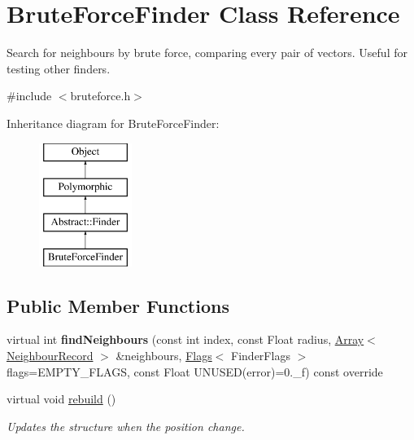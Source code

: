 \hypertarget{classBruteForceFinder}{}\section{Brute\+Force\+Finder Class Reference}
\label{classBruteForceFinder}


Search for neighbours by \textquotesingle{}brute force\textquotesingle{}, comparing every pair of vectors. Useful for testing other finders.  




{\ttfamily \#include $<$bruteforce.\+h$>$}

Inheritance diagram for Brute\+Force\+Finder\+:\begin{figure}[H]
\begin{center}
\leavevmode
\includegraphics[height=4.000000cm]{classBruteForceFinder}
\end{center}
\end{figure}
\subsection*{Public Member Functions}
\begin{DoxyCompactItemize}
\item 
\hypertarget{classBruteForceFinder_a9cbffd174d9cc0997a0ab013f37c9fa3}{}\label{classBruteForceFinder_a9cbffd174d9cc0997a0ab013f37c9fa3} 
virtual int {\bfseries find\+Neighbours} (const int index, const Float radius, \hyperlink{classArray}{Array}$<$ \hyperlink{structNeighbourRecord}{Neighbour\+Record} $>$ \&neighbours, \hyperlink{classFlags}{Flags}$<$ Finder\+Flags $>$ flags=E\+M\+P\+T\+Y\+\_\+\+F\+L\+A\+GS, const Float U\+N\+U\+S\+ED(error)=0.\+\_\+f) const override
\item 
\hypertarget{classBruteForceFinder_a139b10deee1d18d4584f291b1c319eb7}{}\label{classBruteForceFinder_a139b10deee1d18d4584f291b1c319eb7} 
virtual void \hyperlink{classBruteForceFinder_a139b10deee1d18d4584f291b1c319eb7}{rebuild} ()
\begin{DoxyCompactList}\small\item\em Updates the structure when the position change. \end{DoxyCompactList}\end{DoxyCompactItemize}
